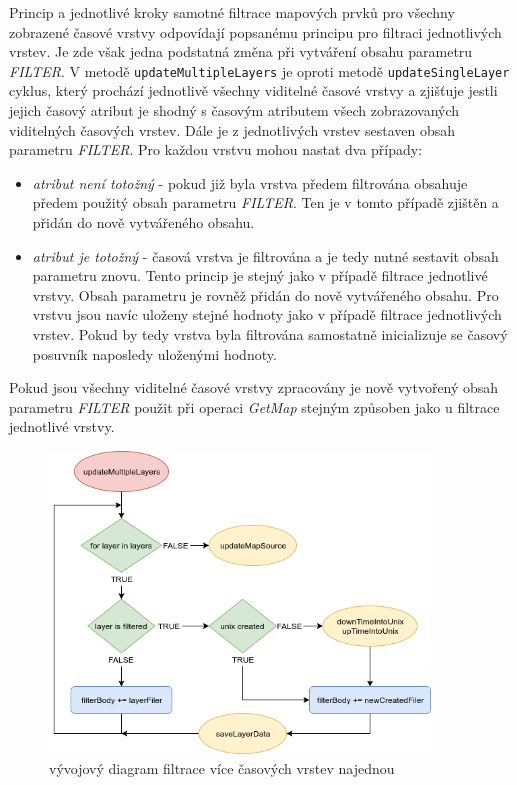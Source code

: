 Princip a jednotlivé kroky samotné filtrace mapových prvků pro všechny
	zobrazené časové vrstvy odpovídají popsanému principu pro
	filtraci jednotlivých vrstev. Je zde však jedna podstatná
	změna při vytváření obsahu parametru \textit{FILTER}. V
	metodě \verb|updateMultipleLayers| je oproti
	metodě \verb|updateSingleLayer| cyklus, který prochází
	jednotlivě všechny viditelné časové vrstvy a zjišťuje jestli
	jejich časový atribut je shodný s časovým atributem všech
	zobrazovaných viditelných časových vrstev. Dále je z
	jednotlivých vrstev sestaven obsah
	parametru \textit{FILTER}. Pro každou vrstvu mohou nastat dva
	případy: \begin{itemize} \item\textit{atribut není totožný} -
	pokud již byla vrstva předem filtrována obsahuje předem
	použitý obsah parametru \textit{FILTER}. Ten je v tomto
	případě zjištěn a přidán do nově vytvářeného
	obsahu.  \item\textit{atribut je totožný} - časová vrstva je
	filtrována a je tedy nutné sestavit obsah parametru
	znovu. Tento princip je stejný jako v případě filtrace
	jednotlivé vrstvy. Obsah parametru je rovněž přidán do nově
	vytvářeného obsahu. Pro vrstvu jsou navíc uloženy stejné
	hodnoty jako v případě filtrace jednotlivých vrstev. Pokud by
	tedy vrstva byla filtrována samostatně inicializuje se časový
	posuvník naposledy uloženými hodnoty.  \end{itemize} Pokud
	jsou všechny viditelné časové vrstvy zpracovány je nově
	vytvořený obsah parametru \textit{FILTER} použit při
	operaci \textit{GetMap} stejným způsoben jako u filtrace
	jednotlivé vrstvy.

\begin{figure}[h!]
	\centering \includegraphics[width=0.9\textwidth]{../img/getMultipleLayers.png} \caption{vývojový
	diagram filtrace více časových vrstev
	najednou} \label{fig:multiple-chart}
\end{figure}

